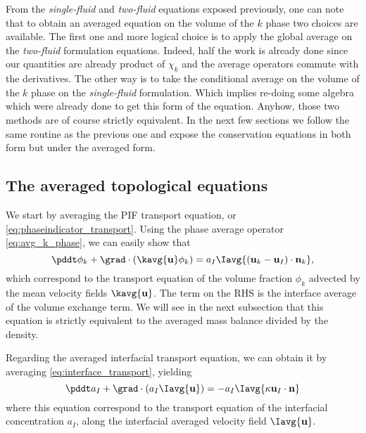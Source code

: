 From the \textit{single-fluid} and \textit{two-fluid} equations exposed previously, one can  note that to obtain an averaged equation on the volume of the $k$ phase two choices are available. 
The first one and more logical choice is to apply the global average on the \textit{two-fluid} formulation equations.
Indeed, half the work is already done since our quantities are already product of $\chi_k$ and the average operators commute with the derivatives.
The other way is to take the conditional average on the volume of the $k$ phase on the \textit{single-fluid} formulation. 
Which implies re-doing some algebra which were already done to get this form of the 
equation.
Anyhow, those two methods are of course strictly equivalent.
In the next few sections we follow the same routine as the previous one and expose the conservation equations in both form but under the averaged form. 


\subsection{The averaged topological equations}

We start by averaging the PIF transport equation, or \ref{eq:phaseindicator_transport}. 
Using the phase average operator \ref{eq:avg_k_phase}, we can easily show that
\begin{equation}
    \pddt \phi_k 
    + \grad \cdot \left(
        \kavg{\textbf{u}}\phi_k 
    \right) 
    = a_I\Iavg{(\textbf{u}_k-\textbf{u}_I) \cdot \textbf{n}_k}, 
\end{equation}
which correspond to the transport equation of the volume fraction $\phi_k$ advected by the mean velocity fields $\kavg{\textbf{u}}$.
The term on the RHS is the interface average of the volume exchange term. 
We will see in the next subsection that this equation is strictly equivalent to the averaged mass balance divided by the density.

Regarding the averaged interfacial transport equation, we can obtain it by averaging \ref{eq:interface_transport}, yielding
\begin{equation}
    \pddt a_I
    + \grad \cdot \left(
        a_I
        \Iavg{\textbf{u}}
    \right)
    = - a_I \Iavg{\kappa \textbf{u}_I \cdot \textbf{n}}
    \label{eq:avg_I_a}
\end{equation}
where this equation correspond to the transport equation of the interfacial concentration $a_I$, along the interfacial averaged velocity field $\Iavg{\textbf{u}}$.

